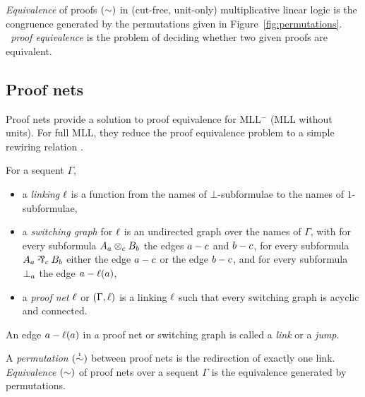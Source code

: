\documentclass[conference,onecolumn]{IEEEtran}
\begin{document}
\begin{definition}
\label{def:equivalence}
%
\emph{Equivalence} of proofs $(\perm)$ in (cut-free, unit-only) multiplicative linear logic is the congruence generated by the permutations given in Figure~\ref{fig:permutations}.
%
\emph{\MLL\ proof equivalence} is the problem of deciding whether two given proofs are equivalent.
%
\end{definition}



\subsection*{Proof nets}

Proof nets provide a solution to proof equivalence for MLL$^-$ (MLL without units).
%
For full MLL, they reduce the proof equivalence problem to a simple rewiring relation \cite{HughesMLLProofNets}.


\begin{definition}
\label{def:proof nets}
%
For a sequent $\Gamma$,
\begin{itemize}

	\item
	a \emph{linking} $\links$ is a function from the names of $\bot$-subformulae to the names of $1$-subformulae,

	\item
	a \emph{switching graph} for $\links$ is an undirected graph over the names of $\Gamma$, with for every subformula $\named aA\named c\tn\named bB$ the edges $\edge ac$ and $\edge bc$, for every subformula $\named aA\named c\parr\named bB$ either the edge $\edge ac$ or the edge $\edge bc$, and for every subformula $\named a\bot$ the edge $\edge a{\links(a)}$,

 	\item
	a \emph{proof net} $\links$ or $(\Gamma,\links)$ is a linking $\links$ such that every switching graph is acyclic and connected.

\end{itemize}
\end{definition}


\noindent
An edge $\edge a{\links(a)}$ in a proof net or switching graph is called a \emph{link} or a \emph{jump}.



\begin{definition}
\label{def:proof net equivalence}
%
A \emph{permutation} $(\perm*)$ between proof nets is the redirection of exactly one link.
%
\emph{Equivalence} $(\perm)$ of proof nets over a sequent $\Gamma$ is the equivalence generated by permutations.
%
\end{definition}
\end{document}
